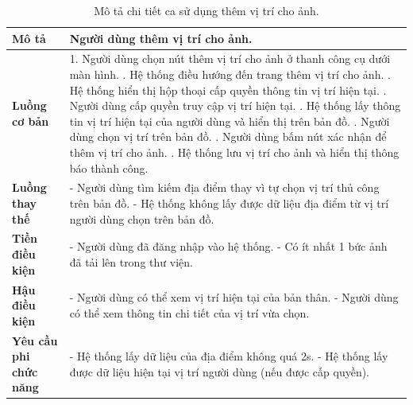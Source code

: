\noindent 
\begin{table}[H]
\centering
\begin{tabularx}{\linewidth}{| l | X |} 
\hline 
\textbf{Mô tả} & Người dùng thêm vị trí cho ảnh. \\
\hline 
\textbf{Luồng cơ bản} & 1. Người dùng chọn nút thêm vị trí cho ảnh ở thanh công cụ dưới màn hình. \newline
                       2. Hệ thống điều hướng đến trang thêm vị trí cho ảnh. \newline
                       3. Hệ thống hiển thị hộp thoại cấp quyền thông tin vị trí hiện tại. \newline
                       4. Người dùng cấp quyền truy cập vị trí hiện tại. \newline
                       5. Hệ thống lấy thông tin vị trí hiện tại của người dùng và hiển thị trên bản đồ. \newline
                       6. Người dùng chọn vị trí trên bản đồ. \newline
                       7. Người dùng bấm nút xác nhận để thêm vị trí cho ảnh. \newline
                       8. Hệ thống lưu vị trí cho ảnh và hiển thị thông báo thành công. \\
\hline
\textbf{Luồng thay thế} & - Người dùng tìm kiếm địa điểm thay vì tự chọn vị trí thủ công trên bản đồ. \newline
                          - Hệ thống không lấy được dữ liệu địa điểm từ vị trí người dùng chọn trên bản đồ. \\
\hline
\textbf{Tiền điều kiện} & - Người dùng đã đăng nhập vào hệ thống. \newline
                          - Có ít nhất 1 bức ảnh đã tải lên trong thư viện. \\
\hline
\textbf{Hậu điều kiện} & - Người dùng có thể xem vị trí hiện tại của bản thân. \newline
                          - Người dùng có thể xem thông tin chi tiết của vị trí vừa chọn. \\
\hline 
\textbf{Yêu cầu phi chức năng} & - Hệ thống lấy dữ liệu của địa điểm không quá 2s. \newline
                           - Hệ thống lấy được dữ liệu hiện tại vị trí người dùng (nếu được cấp quyền). \\
\hline 
\end{tabularx}
\caption{Mô tả chi tiết ca sử dụng thêm vị trí cho ảnh.}
\label{tab:add-location-usecase}
\end{table}


